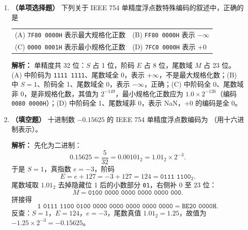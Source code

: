 \begin{enumerate}
\ifshowsolutions\par\noindent\textbf{解析：} 先求真值：$\texttt{7BH}=0111\,1011_2=+123$，$\texttt{0AH}=0000\,1010_2=+10$，真值和为 $133$，已超过 8 位补码最大值 $127$，故必然溢出。按位相加：
\[
\begin{array}{r}
0111\,1011\\
+\,0000\,1010\\ \hline
1000\,0101
\end{array}
\]
结果为 \texttt{85H}。符号位（第 7 位）向外的进位 $C_7=0$，最高数值位（第 6 位）向符号位的进位 $C_6=1$，故
\[
\text{OF}=C_7\oplus C_6=0\oplus1=1.
\]
CF 取符号位的进位输出，即 CF$=C_7=0$。两个正数相加得到符号位为 1 的结果，也直接说明发生了正溢出。\else \answerarea \fi

\item \textbf{（单项选择题）} 下列关于 IEEE 754 单精度浮点数特殊编码的叙述中，正确的是
\begin{center}
\begin{tabular}{ll}
(A) \texttt{7F80 0000H} 表示最大规格化正数 & (B) \texttt{FF80 0000H} 表示 $-\infty$ \\[4pt]
(C) \texttt{0000 0001H} 表示最小规格化正数 & (D) \texttt{7FC0 0000H} 表示 $+0$
\end{tabular}
\end{center}

\ifshowsolutions\par\noindent\textbf{解析：} 单精度共 32 位：$S$ 占 1 位，阶码 $E$ 占 8 位，尾数域 $M$ 占 23 位。(A) 中阶码为 \texttt{1111 1111}、尾数域全 0，表示 $+\infty$，不是最大规格化数；(B) 中 $S=1$、阶码全 1、尾数域全 0，表示 $-\infty$，正确；(C) 中阶码全 0、尾数域非 0，是非规格化数，其值为 $2^{-149}$，最小规格化正数应为 $1.0\times2^{-126}$（编码 \texttt{0080 0000H}）；(D) 中阶码全 1、尾数域非 0，表示 NaN，$+0$ 的编码是全 0。\else \answerarea \fi

\item \textbf{（填空题）} 十进制数 $-0.15625$ 的 IEEE 754 单精度浮点数编码为 \underline{\qquad\qquad}（用十六进制表示）。

\ifshowsolutions\par\noindent\textbf{解析：} 先化为二进制：
\[
0.15625=\frac{5}{32}=0.00101_2=1.01_2\times2^{-3}.
\]
于是 $S=1$，真指数 $e=-3$，阶码
\[
E=e+127=-3+127=124=\texttt{0111 1100}_2.
\]
尾数域取 $1.01_2$ 去掉隐藏位 1 后的小数部分 \texttt{01}，右侧补 0 至 23 位：
\[
M=\texttt{0100 0000 0000 0000 0000 000}.
\]
拼接得
\[
\texttt{1\ 0111 1100\ 0100 0000 0000 0000 0000 0000}
=\texttt{BE20 0000H}.
\]
反查：$S=1$，$E=124$，$e=-3$，尾数真值 $1.01_2=1.25$，故值为 $-1.25\times2^{-3}=-0.15625$。\else \answerarea \fi


\end{enumerate}
